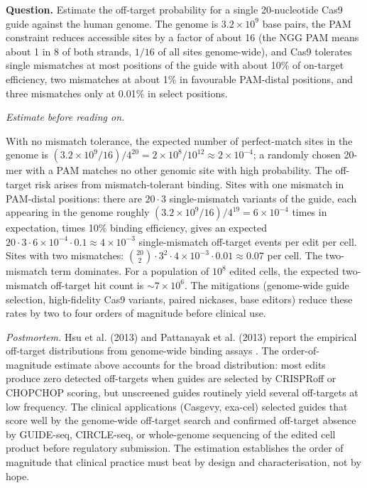 \begin{estimation}
\textbf{Question.} Estimate the off-target probability for a single
20-nucleotide Cas9 guide against the human genome. The genome is
$3.2 \times 10^{9}$ base pairs, the PAM constraint reduces accessible
sites by a factor of about 16 (the NGG PAM means about 1 in 8 of
both strands, $1/16$ of all sites genome-wide), and Cas9 tolerates
single mismatches at most positions of the guide with about 10\%
of on-target efficiency, two mismatches at about 1\% in
favourable PAM-distal positions, and three mismatches only at
0.01\% in select positions.

\smallskip
\textit{Estimate before reading on.}

\smallskip
With no mismatch tolerance, the expected number of perfect-match
sites in the genome is $(3.2 \times 10^{9}/16)/4^{20} = 2 \times 10^{8}/10^{12} \approx 2 \times 10^{-4}$;
a randomly chosen 20-mer with a PAM matches no other genomic site
with high probability. The off-target risk arises from
mismatch-tolerant binding. Sites with one mismatch in PAM-distal
positions: there are $20 \cdot 3$ single-mismatch variants of the
guide, each appearing in the genome roughly
$(3.2 \times 10^{9}/16)/4^{19} = 6 \times 10^{-4}$ times in expectation,
times 10\% binding efficiency, gives an expected
$20 \cdot 3 \cdot 6 \times 10^{-4} \cdot 0.1 \approx 4 \times 10^{-3}$
single-mismatch off-target events per edit per cell. Sites with two
mismatches: $\binom{20}{2} \cdot 3^{2} \cdot 4 \times 10^{-3} \cdot 0.01 \approx 0.07$ per cell. The two-mismatch term dominates.
For a population of $10^{8}$ edited cells, the expected
two-mismatch off-target hit count is $\sim 7 \times 10^{6}$. The
mitigations (genome-wide guide selection, high-fidelity Cas9
variants, paired nickases, base editors) reduce these rates by
two to four orders of magnitude before clinical use.

\smallskip
\textit{Postmortem.} Hsu et al. (2013) and Pattanayak et al. (2013)
report the empirical off-target distributions from genome-wide
binding assays
\cite[pp.~828--829]{paper:v6c09-hsu-offtarget-2013}\cite[pp.~840--843]{paper:v6c09-pattanayak-offtarget-2013}. The
order-of-magnitude estimate above accounts for the broad
distribution: most edits produce zero detected off-targets when
guides are selected by CRISPRoff or CHOPCHOP scoring, but
unscreened guides routinely yield several off-targets at low
frequency. The clinical applications (Casgevy, exa-cel) selected
guides that score well by the genome-wide off-target search and
confirmed off-target absence by GUIDE-seq, CIRCLE-seq, or whole-genome
sequencing of the edited cell product before regulatory submission.
The estimation establishes the order of magnitude that clinical
practice must beat by design and characterisation, not by hope.
\end{estimation}

